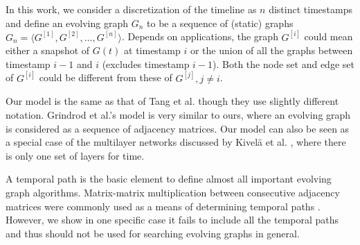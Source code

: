 \documentclass[11pt, conference, , compsocconf]{IEEEtran}
\theoremstyle{definition}
\begin{document}
In this work, we consider a discretization of the timeline as $n$ distinct 
timestamps and define an evolving graph $G_n$ to be 
a sequence of (static) graphs 
$G_n = \langle G^{[1]}, G^{[2]}, \ldots, G^{[n]} \rangle$. 
Depends on applications, the graph $G^{[i]}$ could mean either
a snapshot of $G(t)$ at timestamp $i$ or  the union of all the graphs
between timestamp $i-1$ and $i$ (excludes timestamp $i-1$).
Both the node set and edge set of $G^{[i]}$ could be different from
these of $G^{[j]}, j \ne i$. 
\begin{center}
\end{center}
Our model is the same as that of Tang et al. \cite{tmml10} though they
use slightly different notation.
Grindrod et al.'s model  \cite{gphe11} \cite{grihig13} is very similar to ours, 
where an evolving graph is considered as a sequence of adjacency matrices.
Our model can also be seen as a special case of 
the multilayer networks discussed by Kivel{\"a} et al. \cite{kabg14}, where 
there is only one set of layers for time.


A temporal path is the basic element to 
 define almost  all important evolving graph algorithms.
Matrix-matrix multiplication between consecutive adjacency matrices
were commonly used as a means of determining temporal paths \cite{gphe11} \cite{grihig13}. However, we show
in one specific case it fails to include all the temporal paths and thus should not be used 
for searching evolving graphs in general.
\end{document}
